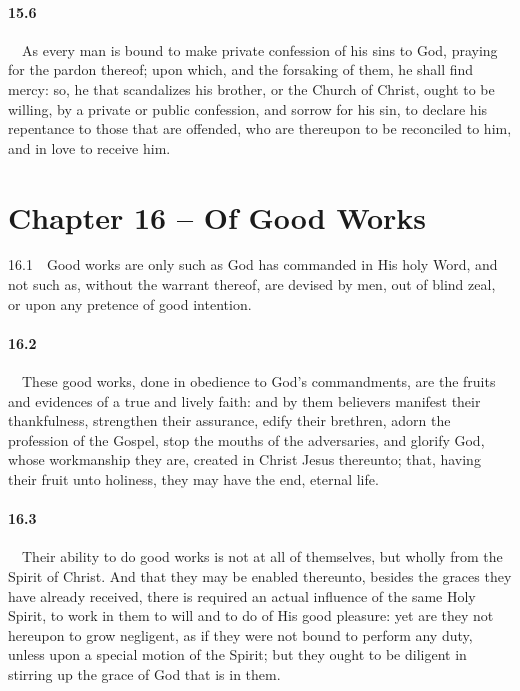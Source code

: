 \paragraph{15.6}\ \ As every man is bound to make private confession of his sins to God, praying for the pardon thereof; upon which, and the forsaking of them, he shall find mercy: so, he that scandalizes his brother, or the Church of Christ, ought to be willing, by a private or public confession, and sorrow for his sin, to declare his repentance to those that are offended, who are thereupon to be reconciled to him, and in love to receive him.  

\section{Chapter 16 -- Of Good Works} 16.1\ \ Good works are only such as God has commanded in His holy Word, and not such as, without the warrant thereof, are devised by men, out of blind zeal, or upon any pretence of good intention.    
\bigskip
\paragraph{16.2}\ \ These good works, done in obedience to God's commandments, are the fruits and evidences of a true and lively faith: and by them believers manifest their thankfulness, strengthen their assurance, edify their brethren, adorn the profession of the Gospel, stop the mouths of the adversaries, and glorify God, whose workmanship they are, created in Christ Jesus thereunto; that, having their fruit unto holiness, they may have the end, eternal life.   
\bigskip
\paragraph{16.3}\ \ Their ability to do good works is not at all of themselves, but wholly from the Spirit of Christ. And that they may be enabled thereunto, besides the graces they have already received, there is required an actual influence of the same Holy Spirit, to work in them to will and to do of His good pleasure: yet are they not hereupon to grow negligent, as if they were not bound to perform any duty, unless upon a special motion of the Spirit; but they ought to be diligent in stirring up the grace of God that is in them.   
\bigskip
